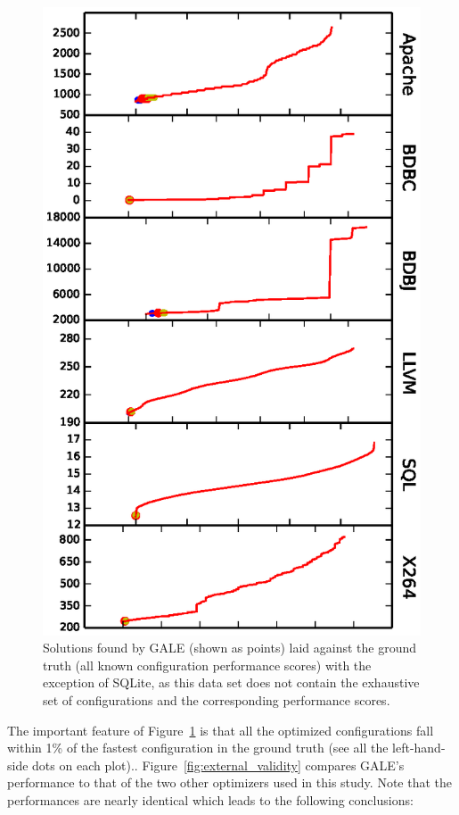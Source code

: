 \documentclass{sig-alternative}
\newcommand{\fig}[1]{Figure~\ref{fig:#1}}
\begin{document}
\begin{figure}[!t]
\includegraphics[width=0.9\linewidth]{Figures/optimizer_result.eps}
\caption{Solutions found by GALE (shown as points) laid against the ground truth (all known configuration performance scores) with the exception of SQLite, as this data set does not contain the exhaustive set of configurations and the corresponding performance scores.}\label{fig:performance_graph}
\end{figure}


The important feature of \fig{performance_graph} is that all the optimized configurations fall within 1\% of the fastest
configuration in the ground truth (see all the left-hand-side dots on each plot).. \fig{external_validity} compares GALE's performance to that of the two other optimizers
used in this study. Note that the performances are nearly identical which leads to the following conclusions:
\end{document}
